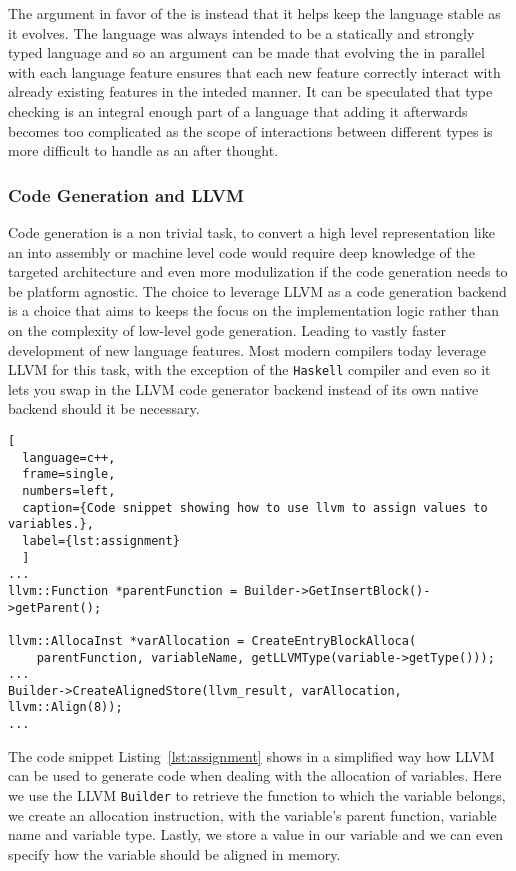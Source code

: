 The argument in favor of the \typeChecker{} is instead that it helps keep the
language stable as it evolves. The language was always intended to be a statically
and strongly typed language and so an argument can be made that evolving the
\typeChecker{} in parallel with each language feature ensures that each new feature
correctly interact with already existing features in the inteded manner. It can be
speculated that type checking is an integral enough part of a language that adding it
afterwards becomes too complicated as the scope of interactions between different
types is more difficult to handle as an after thought. \\ 

\subsubsection{Code Generation and LLVM}

Code generation is a non trivial task, to convert a high level representation like an
\ast{} into assembly or machine level code would require deep knowledge of the targeted
architecture and even more modulization if the code generation needs to be platform
agnostic. The choice to leverage LLVM as a code generation backend is a choice that
aims to keeps the focus on the implementation logic rather than on
the complexity of low-level gode generation. Leading to vastly faster development of
new language features. Most modern compilers today leverage LLVM for this task, with
the exception of the \texttt{Haskell} compiler and even so it lets you swap in the
LLVM code generator backend instead of its own native backend should it be necessary.

\begin{lstlisting}[
  language=c++,
  frame=single,
  numbers=left,
  caption={Code snippet showing how to use llvm to assign values to variables.},
  label={lst:assignment}
  ]
...
llvm::Function *parentFunction = Builder->GetInsertBlock()->getParent();

llvm::AllocaInst *varAllocation = CreateEntryBlockAlloca(
    parentFunction, variableName, getLLVMType(variable->getType()));
...
Builder->CreateAlignedStore(llvm_result, varAllocation, llvm::Align(8));
...
\end{lstlisting}

The code snippet Listing~\ref{lst:assignment} shows in a simplified way how LLVM can
be used to generate code when dealing with the allocation of variables.
Here we use the LLVM \texttt{Builder} to retrieve the function to which the variable
belongs, we create an allocation instruction, with the variable's parent function,
variable name and variable type. Lastly, we store a value in our variable and we can
even specify how the variable should be aligned in memory.\\

